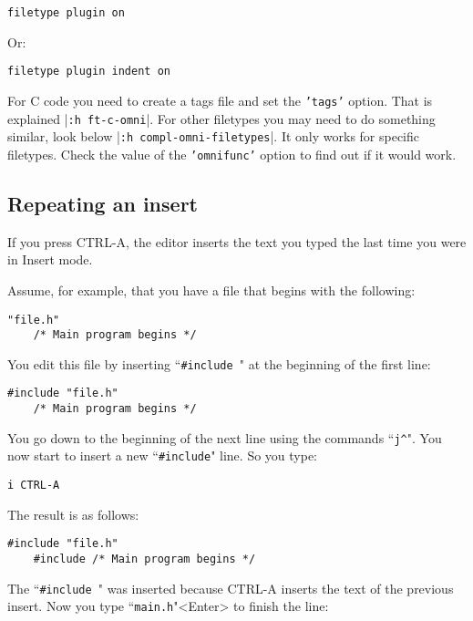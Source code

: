 \begin{Verbatim}[samepage=true]
 filetype plugin on
\end{Verbatim}
 
Or:

\begin{Verbatim}[samepage=true]
 filetype plugin indent on
\end{Verbatim}

For C code you need to create a tags file and set the \texttt{'tags'} option.
That is explained |\texttt{:h ft-c-omni}|.
For other filetypes you may need to do something similar, look below |\texttt{:h compl-omni-filetypes}|.
It only works for specific filetypes.
Check the value of the \texttt{'omnifunc'} option to find out if it would work.
\subsection{Repeating an insert}
If you press CTRL-A, the editor inserts the text you typed the last time you were in Insert mode.

Assume, for example, that you have a file that begins with the following:

\begin{Verbatim}[samepage=true]
    "file.h" 
    /* Main program begins */ 
\end{Verbatim}

You edit this file by inserting ``\texttt{\#include }" at the beginning of the first line:

\begin{Verbatim}[samepage=true]
    #include "file.h" 
    /* Main program begins */ 
\end{Verbatim}

You go down to the beginning of the next line using the commands ``\texttt{j\^{}}".
You now start to insert a new ``\texttt{\#include}" line.
So you type:

\begin{Verbatim}[samepage=true]
 i CTRL-A
\end{Verbatim}

The result is as follows:

\begin{Verbatim}[samepage=true]
    #include "file.h" 
    #include /* Main program begins */ 
\end{Verbatim}

The ``\texttt{\#include }" was inserted because CTRL-A inserts the text of the previous insert.
Now you type  ``\texttt{main.h}"<Enter>  to finish the line:



